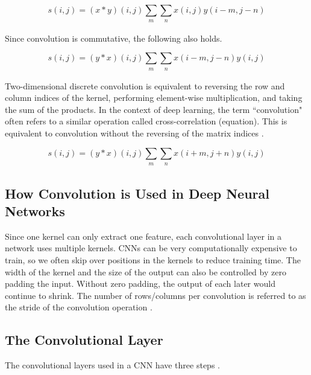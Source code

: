 \documentclass{article}
\begin{document}
\begin{equation}
    s(i,j) = (x*y)(i,j)\sum\limits_{\substack{m}}\sum\limits_{\substack{n}} x(i,j)y(i-m,j-n)
    \label{2D-discrete-convolution}
\end{equation}

Since convolution is commutative, the following also holds. 

\begin{equation}
    s(i,j) = (y*x)(i,j)\sum\limits_{\substack{m}}\sum\limits_{\substack{n}} x(i-m,j-n)y(i,j)
    \label{flipped-2D-discrete-convolution}
\end{equation}

Two-dimensional discrete convolution is equivalent to reversing the row and column indices of the kernel, performing element-wise multiplication, and taking the sum of the products. In the context of deep learning, the term ``convolution" often refers to a similar operation called cross-correlation (equation). This is equivalent to convolution without the reversing of the matrix indices \cite{Goodfellow-et-al-2016}. 

\begin{equation}
    s(i,j) = (y*x)(i,j)\sum\limits_{\substack{m}}\sum\limits_{\substack{n}} x(i+m,j+n)y(i,j)
    \label{cross-correlation}
\end{equation}

\subsection{How Convolution is Used in Deep Neural Networks}

Since one kernel can only extract one feature, each convolutional layer in a network uses multiple kernels. CNNs can be very computationally expensive to train, so we often skip over positions in the kernels to reduce training time. The width of the kernel and the size of the output can also be controlled by zero padding the input. Without zero padding, the output of each later would continue to shrink. The number of rows/columns per convolution is referred to as the stride of the convolution operation \cite{Goodfellow-et-al-2016}. %


\subsection{The Convolutional Layer}

The convolutional layers used in a CNN have three steps \cite{Goodfellow-et-al-2016}.
\end{document}
